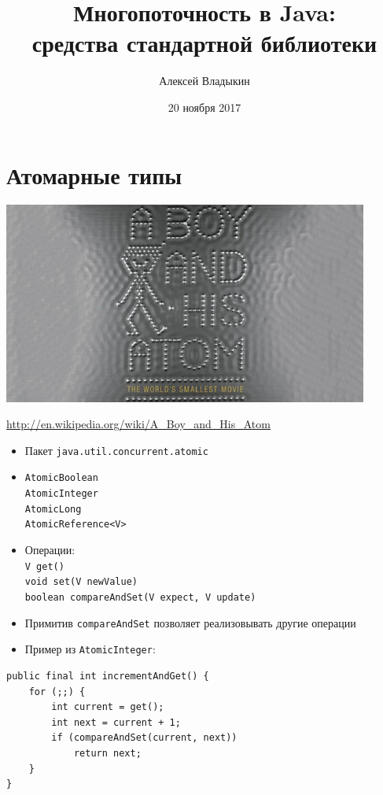 \documentclass[unicode]{beamer}
\title[Многопоточность (2)]{Многопоточность в Java:\\средства стандартной библиотеки}
\author{Алексей Владыкин}
\date{20 ноября 2017}
\begin{document}
\begin{frame}
\titlepage
\end{frame}

\begin{frame}
\tableofcontents
\end{frame}


\section{Атомарные типы}

\begin{frame}
\centering
\includegraphics[width=0.9\textwidth]{pics/atomic.jpg}

\underline{\url{http://en.wikipedia.org/wiki/A_Boy_and_His_Atom}}
\end{frame}


\begin{frame}
\begin{itemize}
\item Пакет \texttt{java.util.concurrent.atomic}
	\bigskip

\item \texttt{AtomicBoolean}\\
	\texttt{AtomicInteger}\\
	\texttt{AtomicLong}\\
	\texttt{AtomicReference<V>}
	\bigskip

\item Операции:\\
	\lstinline{V get()}\\
	\lstinline{void set(V newValue)}\\
	\lstinline{boolean compareAndSet(V expect, V update)}
\end{itemize}
\end{frame}


\begin{frame}[fragile]
\begin{itemize}
\item Примитив \texttt{compareAndSet} позволяет реализовывать другие операции
	\bigskip

\item Пример из \texttt{AtomicInteger}:
\end{itemize}
\begin{lstlisting}
public final int incrementAndGet() {
    for (;;) {
        int current = get();
        int next = current + 1;
        if (compareAndSet(current, next))
            return next;
    }
}
\end{lstlisting}
\end{frame}
\end{document}
